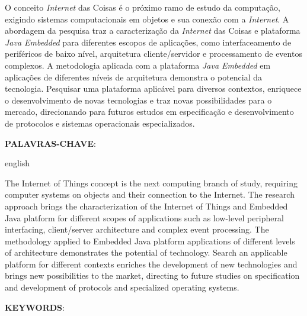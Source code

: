 \begin{resumo}

    O conceito \textit{Internet} das Coisas é o próximo ramo de estudo da
    computação, exigindo sistemas computacionais em objetos e sua conexão com a
    \textit{Internet}.  A abordagem da pesquisa traz a caracterização da
    \textit{Internet} das Coisas e plataforma \textit{Java Embedded} para
    diferentes escopos de aplicações, como interfaceamento de periféricos de
    baixo nível, arquitetura cliente/servidor e processamento de eventos
    complexos.  A metodologia aplicada com a plataforma \textit{Java Embedded}
    em aplicações de diferentes níveis de arquitetura demonstra o potencial da
    tecnologia.  Pesquisar uma plataforma aplicável para diversos contextos,
    enriquece o desenvolvimento de novas tecnologias e traz novas
    possibilidades para o mercado, direcionando para futuros estudos em
    especificação e desenvolvimento de protocolos e sistemas operacionais
    especializados.

    \vspace{\onelineskip}
    \noindent
    \textbf{\uppercase{Palavras-chave}}: \palavraschave

\end{resumo}

\begin{resumo}[Abstract]

    \begin{otherlanguage*}{english}

        The Internet of Things concept is the next computing branch of study,
        requiring computer systems on objects and their connection to the
        Internet.  The research approach brings the characterization of the
        Internet of Things and Embedded Java platform for different scopes of
        applications such as low-level peripheral interfacing, client/server
        architecture and complex event processing.  The methodology applied to
        Embedded Java platform applications of different levels of architecture
        demonstrates the potential of technology.  Search an applicable
        platform for different contexts enriches the development of new
        technologies and brings new possibilities to the market, directing to
        future studies on specification and development of protocols and
        specialized operating systems.

        \vspace{\onelineskip}
        \noindent
        \textbf{\uppercase{Keywords}}: \keywords

    \end{otherlanguage*}

\end{resumo}
